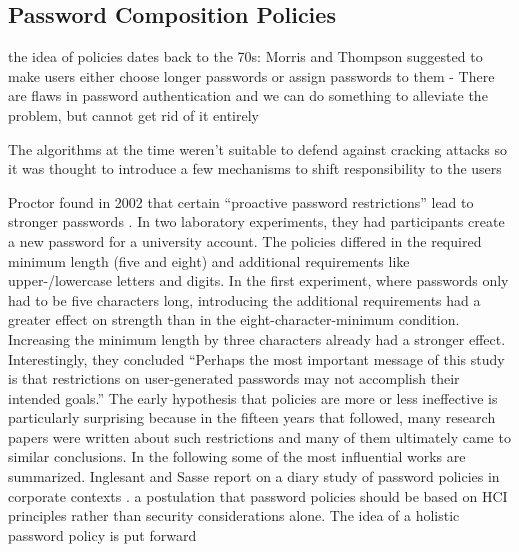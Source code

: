	\subsection{Password Composition Policies}
	
	the idea of policies dates back to the 70s: Morris and Thompson suggested to make users
	either choose longer passwords or assign passwords to them - There are flaws in password authentication and we can do something to alleviate the problem, but cannot get rid of it entirely \cite{Morris1979PasswordSecurity}
	
	The algorithms at the time weren't suitable to defend against cracking attacks so it was thought to introduce a few mechanisms to shift responsibility to the users \cite{Feldmeier1990UnixPasswordSecurity}
	

	Proctor \etal found in 2002 that certain ``proactive password restrictions'' lead to stronger passwords \cite{Proctor2002ImprovingAuthenticationProactivePasswordRestrictions}. In two laboratory experiments, they had participants create a new password for a university account. The policies differed in the required minimum length (five and eight) and additional requirements like upper-/lowercase letters and digits. In the first experiment, where passwords only had to be five characters long, introducing the additional requirements had a greater effect on strength than in the eight-character-minimum condition. Increasing the minimum length by three characters already had a stronger effect. Interestingly, they concluded ``Perhaps the most important message of this study is that restrictions on user-generated passwords may not accomplish their intended goals.'' The early hypothesis that policies are more or less ineffective is particularly surprising because in the fifteen years that followed, many research papers were written about such restrictions and many of them ultimately came to similar conclusions. In the following some of the most influential works are summarized.
	Inglesant and Sasse report on a diary study of password policies in corporate contexts \cite{Inglesant2010TrueCostOfUnusablePolicies}. a postulation that password policies should be based on HCI principles rather than security considerations alone. The idea of a holistic password policy is put forward 
	
